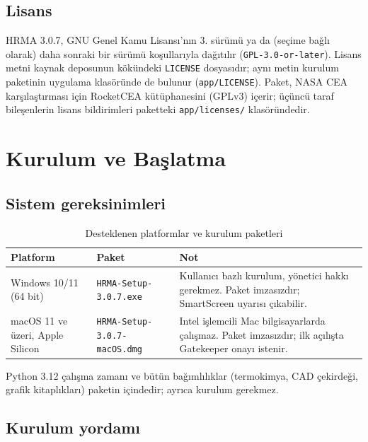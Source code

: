 \documentclass[11pt,a4paper]{article}
\newcommand{\kod}[1]{\texttt{#1}}
\begin{document}
\subsection{Lisans}\label{sec:lisans}

HRMA 3.0.7, GNU Genel Kamu Lisansı'nın 3. sürümü ya da (seçime bağlı olarak)
daha sonraki bir sürümü koşullarıyla dağıtılır (\kod{GPL-3.0-or-later}).
Lisans metni kaynak deposunun kökündeki \kod{LICENSE} dosyasıdır; aynı metin
kurulum paketinin uygulama klasöründe de bulunur (\kod{app/\allowbreak{}LICENSE}). Paket,
NASA CEA karşılaştırması için RocketCEA kütüphanesini (GPLv3) içerir;
üçüncü taraf bileşenlerin lisans bildirimleri paketteki \kod{app/\allowbreak{}licenses/\allowbreak{}}
klasöründedir.

\section{Kurulum ve Başlatma}\label{sec:kurulum}

\subsection{Sistem gereksinimleri}

\begin{table}[htbp]
\centering\small
\caption{Desteklenen platformlar ve kurulum paketleri}\label{tab:platform}
\begin{tabular}{@{}>{\raggedright\arraybackslash}p{3.2cm}>{\raggedright\arraybackslash}p{5.0cm}>{\raggedright\arraybackslash}p{7.4cm}@{}}
\toprule
\textbf{Platform} & \textbf{Paket} & \textbf{Not} \\
\midrule
Windows 10/11 (64 bit) & \kod{HRMA-Setup-3.0.7.exe} & Kullanıcı bazlı kurulum, yönetici hakkı gerekmez. Paket imzasızdır; SmartScreen uyarısı çıkabilir. \\
macOS 11 ve üzeri, Apple Silicon & \kod{HRMA-Setup-3.0.7-macOS.dmg} & Intel işlemcili Mac bilgisayarlarda çalışmaz. Paket imzasızdır; ilk açılışta Gatekeeper onayı istenir. \\
\bottomrule
\end{tabular}
\end{table}

Python 3.12 çalışma zamanı ve bütün bağımlılıklar (termokimya, CAD çekirdeği,
grafik kitaplıkları) paketin içindedir; ayrıca kurulum gerekmez.

\subsection{Kurulum yordamı}
\end{document}
